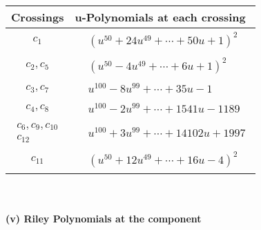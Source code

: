 \documentclass[1p]{elsarticle_modified}
\theoremstyle{definition}
\begin{document}
\begin{tabular}{m{50pt}|m{274pt}}
Crossings & \hspace{64pt}u-Polynomials at each crossing \\
\hline $$\begin{aligned}c_{1}\end{aligned}$$&$\begin{aligned}
&(u^{50}+24 u^{49}+\cdots+50 u+1)^{2}
\end{aligned}$\\
\hline $$\begin{aligned}c_{2},c_{5}\end{aligned}$$&$\begin{aligned}
&(u^{50}-4 u^{49}+\cdots+6 u+1)^{2}
\end{aligned}$\\
\hline $$\begin{aligned}c_{3},c_{7}\end{aligned}$$&$\begin{aligned}
&u^{100}-8 u^{99}+\cdots+35 u-1
\end{aligned}$\\
\hline $$\begin{aligned}c_{4},c_{8}\end{aligned}$$&$\begin{aligned}
&u^{100}-2 u^{99}+\cdots+1541 u-1189
\end{aligned}$\\
\hline $$\begin{aligned}c_{6},c_{9},c_{10}\\c_{12}\end{aligned}$$&$\begin{aligned}
&u^{100}+3 u^{99}+\cdots+14102 u+1997
\end{aligned}$\\
\hline $$\begin{aligned}c_{11}\end{aligned}$$&$\begin{aligned}
&(u^{50}+12 u^{49}+\cdots+16 u-4)^{2}
\end{aligned}$\\
\hline
\end{tabular}\\~\\
\newpage\renewcommand{\arraystretch}{1}
\flushleft \textbf{(v) Riley Polynomials at the component}\newline \\
\end{document}
